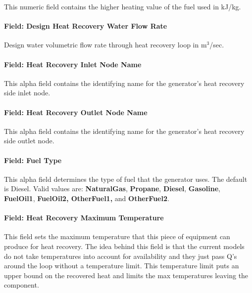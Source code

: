 This numeric field contains the higher heating value of the fuel used in kJ/kg.

\paragraph{Field: Design Heat Recovery Water Flow Rate}\label{field-design-heat-recovery-water-flow-rate}

Design water volumetric flow rate through heat recovery loop in m\(^{3}\)/sec.

\paragraph{Field: Heat Recovery Inlet Node Name}\label{field-heat-recovery-inlet-node-name}

This alpha field contains the identifying name for the generator's heat recovery side inlet node.

\paragraph{Field: Heat Recovery Outlet Node Name}\label{field-heat-recovery-outlet-node-name}

This alpha field contains the identifying name for the generator's heat recovery side outlet node.

\paragraph{Field: Fuel Type}\label{field-fuel-type}

This alpha field determines the type of fuel that the generator uses. The default is Diesel. Valid values are: \textbf{NaturalGas}, \textbf{Propane}, \textbf{Diesel}, \textbf{Gasoline}, \textbf{FuelOil1}, \textbf{FuelOil2, OtherFuel1,} and \textbf{OtherFuel2}.

\paragraph{Field: Heat Recovery Maximum Temperature}\label{field-heat-recovery-maximum-temperature}

This field sets the maximum temperature that this piece of equipment can produce for heat recovery. The idea behind this field is that the current models do not take temperatures into account for availability and they just pass Q's around the loop without a temperature limit. This temperature limit puts an upper bound on the recovered heat and limits the max temperatures leaving the component.

